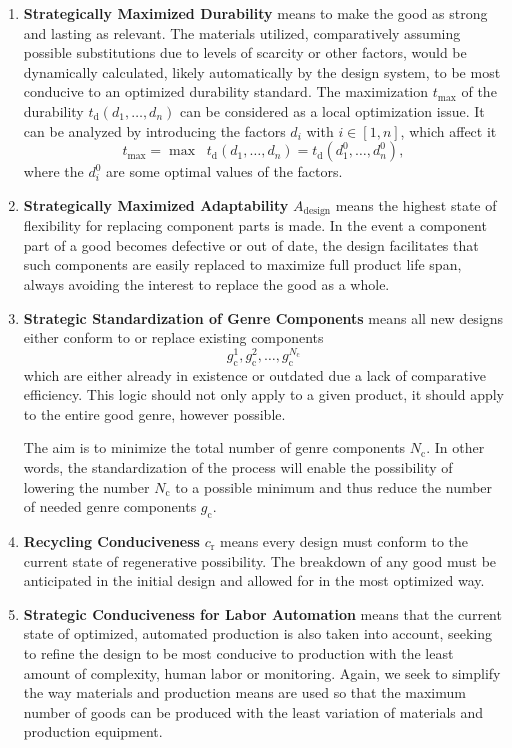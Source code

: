 \documentclass[10pt, a4paper, cleardoubleempty, openright, twoside]{book}
\begin{document}
\begin{enumerate}
  \item 
  \textbf{Strategically Maximized Durability} means to make the good
  as strong and lasting as relevant. The materials utilized,
  comparatively assuming possible substitutions due to levels of scarcity
  or other factors, would be dynamically calculated, likely automatically
  by the design system, to be most conducive to an optimized durability
  standard.
  The maximization $t_\text{max}$ of the durability
  $t_\text{d}(d_1,\dots,d_n)$ can
  be considered as a local optimization issue. It can be analyzed by
  introducing the factors $d_i$ with $i\in[1,n]$, which affect it 
  $$
 		t_\text{max} = \max \;\; t_\text{d}(d_1,\dots,d_n) =
 		t_\text{d}(d^0_1,\dots,d^0_n),
  $$
  where the $d^0_i$ are some optimal values of the factors.

  \item
  \textbf{Strategically Maximized Adaptability} $A_\text{design}$
  means the highest state of flexibility for replacing component parts is
  made. In the event a component part of a good becomes defective or out
  of date, the design facilitates that such components are easily
  replaced to maximize full product life span, always avoiding the
  interest to replace the good as a whole.
 
  \item
  \textbf{Strategic Standardization of Genre Components} means all new designs either conform to or replace existing components
  $$
 	 g^1_\text{c}, g^2_\text{c}, \dots, g^{N_\text{c}}_\text{c}
  $$
  which are either already in existence or outdated due a lack of
  comparative efficiency. This logic should not only apply to a given
  product, it should apply to the entire good genre, however possible. 
 
  The aim is to minimize the total number of genre components
  $N_\text{c}$. In other words, the standardization of the process will
  enable the possibility of lowering the number $N_\text{c}$ to a
  possible minimum and thus reduce the number of needed genre components
  $g_\text{c}$.

	\item
	\textbf{Recycling Conduciveness} $c_\text{r}$ means every design must
	conform to the current state of regenerative possibility. The
	breakdown of any good must be anticipated in the initial design and
	allowed for in the most optimized way.

	\item 
	\textbf{Strategic Conduciveness for Labor Automation} means that the
	current state of optimized, automated production is also taken into
	account, seeking to refine the design to be most conducive to
	production with the least amount of complexity, human labor or
	monitoring. Again, we seek to simplify the way materials and
	production means are used so that the maximum number of goods can be
	produced with the least variation of materials and production
	equipment. 


\end{enumerate}
\end{document}
